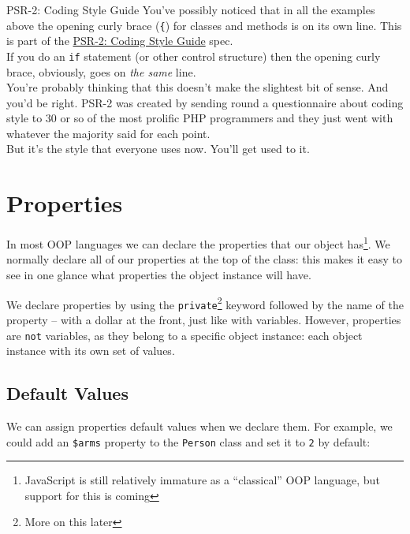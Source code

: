 \begin{infobox}{PSR-2: Coding Style Guide}
    You've possibly noticed that in all the examples above the opening curly brace (\texttt{\{}) for classes and methods is on its own line. This is part of the \href{https://www.php-fig.org/psr/psr-2/}{PSR-2: Coding Style Guide} spec.
    \\

    If you do an \texttt{if} statement (or other control structure) then the opening curly brace, obviously, goes on \textit{the same} line.
    \\

    You're probably thinking that this doesn't make the slightest bit of sense. And you'd be right. PSR-2 was created by sending round a questionnaire about coding style to 30 or so of the most prolific PHP programmers and they just went with whatever the majority said for each point.
    \\

    But it's the style that everyone uses now. You'll get used to it.
\end{infobox}

\section{Properties}

In most OOP languages we can declare the properties that our object has\footnote{JavaScript is still relatively immature as a ``classical'' OOP language, but support for this is coming}. We normally declare all of our properties at the top of the class: this makes it easy to see in one glance what properties the object instance will have.


We declare properties by using the \texttt{private}\footnote{More on this later} keyword followed by the name of the property – with a dollar at the front, just like with variables. However, properties are \texttt{not} variables, as they belong to a specific object instance: each object instance with its own set of values.

\subsection{Default Values}

We can assign properties default values when we declare them. For example, we could add an \texttt{\$arms} property to the \texttt{Person} class and set it to \texttt{2} by default:

